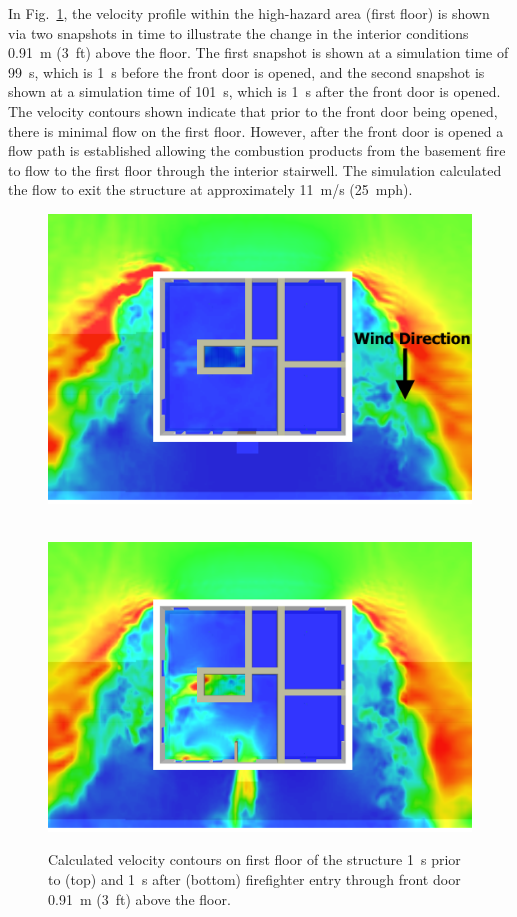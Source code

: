 \documentclass[12pt,oneside]{book}
\begin{document}
In Fig.~\ref{fig:velocity_slices}, the velocity profile within the high-hazard area (first floor) is shown via two snapshots in time to illustrate the change in the interior conditions 0.91~m (3~ft) above the floor. The first snapshot is shown at a simulation time of 99~s, which is 1~s before the front door is opened, and the second snapshot is shown at a simulation time of 101~s, which is 1~s after the front door is opened. The velocity contours shown indicate that prior to the front door being opened, there is minimal flow on the first floor. However, after the front door is opened a flow path is established allowing the combustion products from the basement fire to flow to the first floor through the interior stairwell. The simulation calculated the flow to exit the structure at approximately 11~m/s (25~mph).

\begin{figure}[!ht]
\includegraphics[trim = 0in 1in 0in 1in, clip=true, width=.65\textwidth]{../Figures/velocity_slice_99s}

 \\
\includegraphics[trim = 0in 1in 0in 1in, clip=true, width=.65\textwidth]{../Figures/velocity_slice_101s}


\caption[Calculated velocity on first floor 1~s before and after front door opens]
{Calculated velocity contours on first floor of the structure 1~s prior to (top) and 1~s after (bottom) firefighter entry through front door 0.91~m (3~ft) above the floor.}
\label{fig:velocity_slices}
\end{figure}
\end{document}
